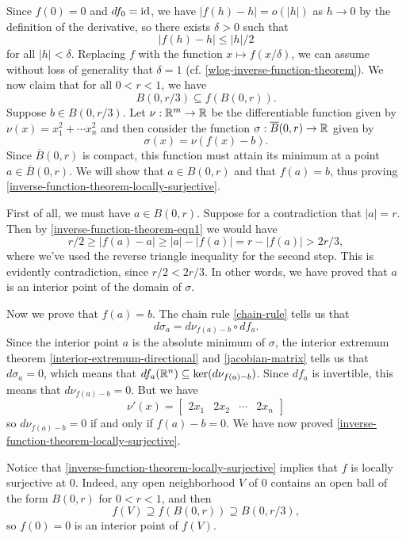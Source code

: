 Since $f(0) = 0$ and $df_0 = \mathrm{id}$, we have $|f(h) - h| = o(|h|)$ as $h \to 0$ by the definition of the derivative, so there exists $\delta > 0$ such that 
\begin{equation} \label{inverse-function-theorem-eqn1} |f(h)-h| \leq |h|/2 \end{equation}
for all $|h| < \delta$. Replacing $f$ with the function $x \mapsto f(x/\delta)$, we can assume without loss of generality that $\delta = 1$ (cf. \cref{wlog-inverse-function-theorem}). We now claim that for all $0 < r < 1$, we have
\begin{equation} \label{inverse-function-theorem-locally-surjective} B(0,r/3) \subseteq f(B(0,r)). \end{equation}
Suppose $b \in B(0, r/3)$. Let $\nu : \mathbb{R}^m \to \mathbb{R}$ be the differentiable function given by $\nu(x) = x_1^2 + \dotsb x_n^2$ and then consider the function $\sigma : \overline{B}(0,r) \to \mathbb{R}$ given by \[ \sigma(x) = \nu(f(x)-b). \]
Since $\overline{B}(0,r)$ is compact, this function must attain its minimum at a point $a \in \overline{B}(0,r)$. We will show that $a \in B(0,r)$ and that $f(a) = b$, thus proving \cref{inverse-function-theorem-locally-surjective}. 

First of all, we must have $a \in B(0,r)$. Suppose for a contradiction that $|a| = r$. Then by \cref{inverse-function-theorem-eqn1} we would have
\[ r/2 \geq |f(a)-a| \geq |a| - |f(a)| = r - |f(a)| > 2r/3, \]
where we've used the reverse triangle inequality for the second step. This is evidently contradiction, since $r/2 < 2r/3$. In other words, we have proved that $a$ is an interior point of the domain of $\sigma$. 

Now we prove that $f(a) = b$. The chain rule \ref{chain-rule} tells us that 
\[ d\sigma_{a} = d\nu_{f(a)-b} \circ df_{a}. \]
Since the interior point $a$ is the absolute minimum of $\sigma$, the interior extremum theorem \ref{interior-extremum-directional} and \cref{jacobian-matrix} tells us that $d\sigma_a = 0$, which means that $df_a(\mathbb{R}^n) \subseteq \ker(d\nu_{f(a)-b})$. Since $df_a$ is invertible, this means that $d\nu_{f(a)-b} = 0$. But we have 
\[ \nu'(x) = \begin{bmatrix} 2x_1 & 2x_2 & \dotsb & 2x_n \end{bmatrix} \]
so $d\nu_{f(a) - b} = 0$ if and only if $f(a) - b = 0$. We have now proved \cref{inverse-function-theorem-locally-surjective}. 

Notice that \cref{inverse-function-theorem-locally-surjective} implies that $f$ is locally surjective at 0. Indeed, any open neighborhood $V$ of 0 contains an open ball of the form $B(0,r)$ for $0 < r < 1$, and then \[ f(V) \supseteq f(B(0,r)) \supseteq B(0,r/3), \] so $f(0) = 0$ is an interior point of $f(V)$. 

